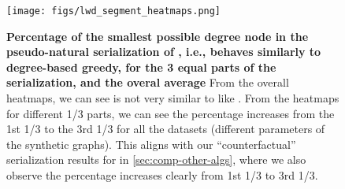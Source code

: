 \begin{figure}
    \centering
    \texttt{[image: figs/lwd\_segment\_heatmaps.png]}
    \caption{\textbf{Percentage of the smallest possible degree node in the pseudo-natural serialization of \lwd, i.e., behaves similarly to degree-based greedy, for the 3 equal parts of the serialization, and the overal average} From the overall heatmaps, we can see \lwd is not very similar to \deggreedy like \gflownets. From the heatmaps for different 1/3 parts, we can see the percentage increases from the 1st 1/3 to the 3rd 1/3 for all the datasets (different parameters of the synthetic graphs). This aligns with our ``counterfactual'' serialization results for \lwd in \cref{sec:comp-other-algs}, where we also observe the percentage increases clearly from 1st 1/3 to 3rd 1/3.}
    \label{fig:toprank-lwd}
\end{figure}